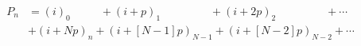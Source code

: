 \documentclass[preview]{standalone}
\begin{document}
\begin{align*}
P_n &= (i)_0\:\:\:\:\:\:\:\:\:\:\:\:+(i+p)_1\:\:\:\:\:\:\:\:\:\:\:\:\:\:\:\:\:\:\:\:+(i+2p)_2\:\:\:\:\:\:\:\:\:\:\:\:\:\:\:\:\:\:\:\:+\cdots\\&+(i+Np)_n+(i+[N-1]p)_{N-1}+(i+[N-2]p)_{N-2}+\cdots
\end{align*}
\end{document}
